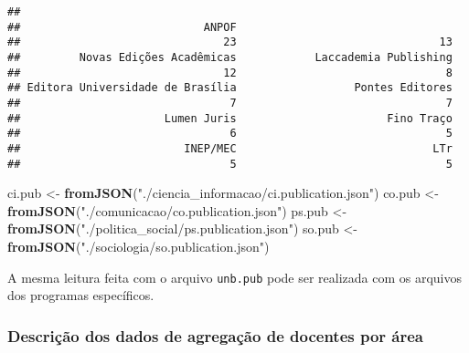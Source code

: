 \documentclass[]{article}
\newenvironment{Shaded}{\begin{snugshade}}{\end{snugshade}}
\newcommand{\KeywordTok}[1]{\textcolor[rgb]{0.13,0.29,0.53}{\textbf{#1}}}
\newcommand{\DataTypeTok}[1]{\textcolor[rgb]{0.13,0.29,0.53}{#1}}
\newcommand{\DecValTok}[1]{\textcolor[rgb]{0.00,0.00,0.81}{#1}}
\newcommand{\StringTok}[1]{\textcolor[rgb]{0.31,0.60,0.02}{#1}}
\newcommand{\ControlFlowTok}[1]{\textcolor[rgb]{0.13,0.29,0.53}{\textbf{#1}}}
\newcommand{\OperatorTok}[1]{\textcolor[rgb]{0.81,0.36,0.00}{\textbf{#1}}}
\newcommand{\NormalTok}[1]{#1}
\begin{document}
\begin{verbatim}
## 
##                            ANPOF                                  
##                               23                               13 
##         Novas Edições Acadêmicas            Laccademia Publishing 
##                               12                                8 
## Editora Universidade de Brasília                  Pontes Editores 
##                                7                                7 
##                      Lumen Juris                       Fino Traço 
##                                6                                5 
##                         INEP/MEC                              LTr 
##                                5                                5
\end{verbatim}

\begin{Shaded}
\begin{Highlighting}[]
\NormalTok{ci.pub <-}\StringTok{ }\KeywordTok{fromJSON}\NormalTok{(}\StringTok{"./ciencia_informacao/ci.publication.json"}\NormalTok{)}
\NormalTok{co.pub <-}\StringTok{ }\KeywordTok{fromJSON}\NormalTok{(}\StringTok{"./comunicacao/co.publication.json"}\NormalTok{)}
\NormalTok{ps.pub <-}\StringTok{ }\KeywordTok{fromJSON}\NormalTok{(}\StringTok{"./politica_social/ps.publication.json"}\NormalTok{)}
\NormalTok{so.pub <-}\StringTok{ }\KeywordTok{fromJSON}\NormalTok{(}\StringTok{"./sociologia/so.publication.json"}\NormalTok{)}
\end{Highlighting}
\end{Shaded}

A mesma leitura feita com o arquivo \texttt{unb.pub} pode ser realizada
com os arquivos dos programas específicos.

\subsubsection{Descrição dos dados de agregação de docentes por
área}\label{descricao-dos-dados-de-agregacao-de-docentes-por-area}

\begin{Shaded}
\end{Shaded}
\end{document}
